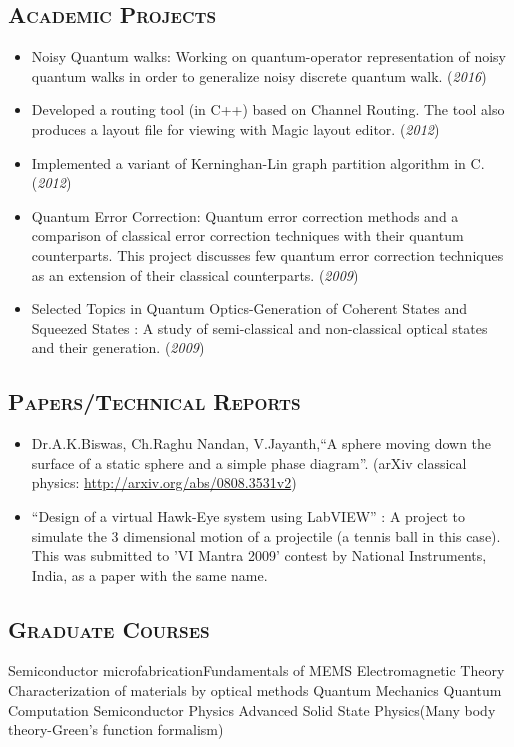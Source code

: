 \documentclass[10pt]{article}
\begin{document}
\subsection*{\textsc{\large Academic Projects}}
\begin{itemize}
\item Noisy Quantum walks: Working on quantum-operator representation of noisy quantum walks in order to generalize noisy discrete quantum walk. (\textit{2016})
\item Developed a routing tool (in C++) based on Channel Routing. The tool also produces a layout file for viewing with Magic layout editor. (\textit{2012})
\item Implemented a variant of Kerninghan-Lin graph partition algorithm in C.(\textit{2012})
\item Quantum Error Correction: Quantum error correction methods and a comparison of classical error correction techniques with their quantum counterparts. This project discusses few quantum error correction techniques as an extension of their classical counterparts. (\textit{2009})
\item Selected Topics in Quantum Optics-Generation of Coherent States and Squeezed States : A study of semi-classical and non-classical optical states and their generation. (\textit{2009})
\end{itemize}

\subsection*{\textsc{\large Papers/Technical Reports}}
\begin{itemize}
\item Dr.A.K.Biswas, Ch.Raghu Nandan, V.Jayanth,``A sphere moving down the surface of a static sphere and a simple phase diagram''. (arXiv classical physics: \url{http://arxiv.org/abs/0808.3531v2})

\item ``Design of a virtual Hawk-Eye system using LabVIEW'' : A project to simulate the 3 dimensional motion of a projectile (a tennis ball in this case). This was submitted to 'VI Mantra 2009' contest by National Instruments, India, as a paper with the same name.
 \end{itemize}

\subsection*{\textsc{\large Graduate Courses}}
Semiconductor microfabrication\hfill Fundamentals of MEMS \newline 
Electromagnetic Theory \hfill Characterization of materials by optical methods \newline
Quantum Mechanics \hfill Quantum Computation \newline
Semiconductor Physics \hfill Advanced Solid State Physics(Many body theory-Green's function formalism)
\end{document}
